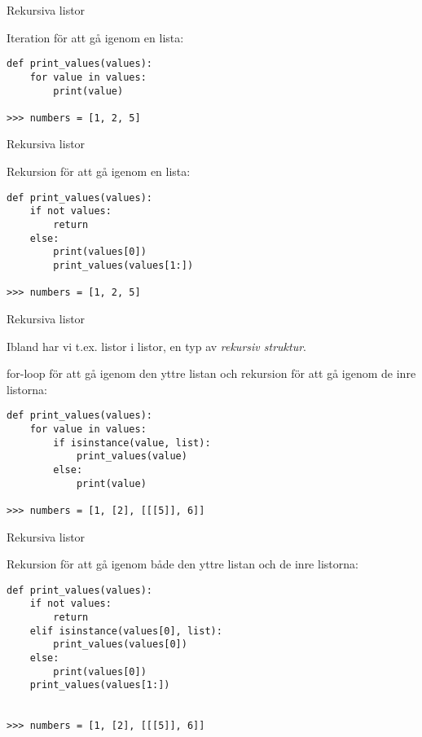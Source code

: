 \documentclass{beamer}
\begin{document}
  \begin{frame}[fragile]{Rekursiva listor}

    Iteration för att gå igenom en lista:

    \begin{verbatim}
def print_values(values):
    for value in values:
        print(value)

>>> numbers = [1, 2, 5]
    \end{verbatim}

  \end{frame}

  \begin{frame}[fragile]{Rekursiva listor}

    Rekursion för att gå igenom en lista:

    \begin{verbatim}
def print_values(values):
    if not values:
        return
    else:
        print(values[0])
        print_values(values[1:])

>>> numbers = [1, 2, 5]
    \end{verbatim}

  \end{frame}

  \begin{frame}[fragile]{Rekursiva listor}

    Ibland har vi t.ex. listor i listor, en typ av \emph{rekursiv struktur}.

    \pause{}

    for-loop för att gå igenom den yttre listan och rekursion för att gå igenom de inre listorna:

    \pause{}

    \begin{verbatim}
def print_values(values):
    for value in values:
        if isinstance(value, list):
            print_values(value)
        else:
            print(value)

>>> numbers = [1, [2], [[[5]], 6]]

    \end{verbatim}

  \end{frame}

  \begin{frame}[fragile]{Rekursiva listor}

    Rekursion för att gå igenom både den yttre listan och de inre listorna:

    \begin{verbatim}
def print_values(values):
    if not values:
        return
    elif isinstance(values[0], list):
        print_values(values[0])
    else:
        print(values[0])
    print_values(values[1:])


>>> numbers = [1, [2], [[[5]], 6]]

    \end{verbatim}

  \end{frame}
\end{document}
